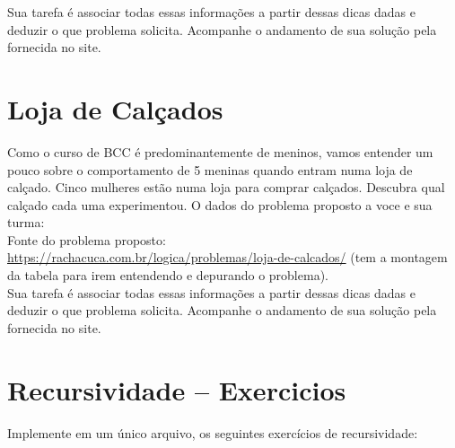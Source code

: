\documentclass[a4paper,12pt]{article}
\begin{document}
\vspace{1.5cm}
 Sua tarefa é associar todas essas informações a partir dessas dicas dadas e deduzir
 o que problema solicita. Acompanhe o andamento de sua solução pela fornecida no site.
\newpage
\section{Loja de Calçados}

Como o curso de BCC é predominantemente de meninos, vamos entender um pouco
sobre o comportamento de 5 meninas quando entram numa loja de calçado.
Cinco mulheres estão numa loja para comprar calçados. 
Descubra qual calçado cada uma experimentou. O dados do 
problema proposto a voce e sua turma:\\
 Fonte do problema proposto:\\
   \url{https://rachacuca.com.br/logica/problemas/loja-de-calcados/}
 (tem a montagem da tabela para irem entendendo e depurando o problema).\\


\vspace{1.5cm}
 Sua tarefa é associar todas essas informações a partir dessas dicas dadas e deduzir o que problema solicita. Acompanhe o andamento de sua solução pela fornecida no site.
\newpage
\section{Recursividade -- Exercicios}


Implemente em um único arquivo, os seguintes exercícios
de recursividade:
\end{document}
